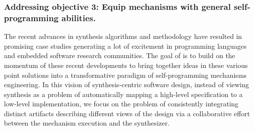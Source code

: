 









\subsubsection{Addressing objective 3: Equip mechanisms with general self-programming abilities.}


The recent advances in synthesis algorithms and methodology have resulted in promising case studies generating a lot of excitement in programming languages and embedded software research communities. The goal of \project is to build on the momentum of these recent developments to bring together ideas in these various point solutions into a transformative paradigm of self-programming mechanisms engineering. In this vision of synthesis-centric software design, instead of viewing synthesis as a problem of automatically mapping a high-level specification to a low-level implementation, we focus on the problem of consistently integrating distinct artifacts describing different views of the design via a collaborative effort between the mechanism execution and the synthesizer.



